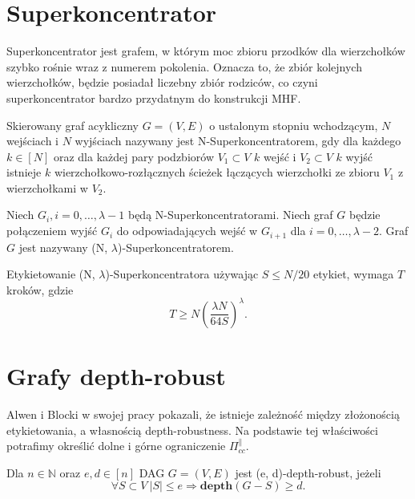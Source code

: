 \section{Superkoncentrator}
Superkoncentrator jest grafem, w którym moc zbioru przodków dla wierzchołków szybko rośnie wraz z numerem pokolenia. Oznacza to, że zbiór kolejnych wierzchołków, będzie posiadał liczebny zbiór rodziców, co czyni superkoncentrator bardzo przydatnym do konstrukcji MHF.
\begin{definition}[N-Superkoncentrator] Skierowany graf acykliczny $G = (V, E)$ o ustalonym stopniu wchodzącym, $N$ wejściach i
	$N$ wyjściach nazywany jest N-Superkoncentratorem, gdy dla każdego $k \in [N]$
	oraz dla każdej pary podzbiorów $V_{1} \subset V$ $k$ wejść i $V_{2} \subset V$ $k$ wyjść istnieje
	$k$ wierzchołkowo-rozłącznych ścieżek łączących wierzchołki ze zbioru $V_{1}$ z wierzchołkami w $V_{2}$.
\end{definition}

\begin{definition} Niech $G_{i}, i = 0, \dots, \lambda-1$ będą N-Superkoncentratorami.
	Niech graf $G$ będzie połączeniem wyjść $G_{i}$ do odpowiadających wejść w $G_{i+1}$ dla $i = 0, \dots, \lambda - 2$.
	Graf $G$ jest nazywany (N, $\lambda$)-Superkoncentratorem.
\end{definition}

\begin{lemma} \cite[Lemat 1]{rs}
	Etykietowanie (N, $\lambda$)-Superkoncentratora używając $S \leq N/20$ etykiet, wymaga $T$ kroków, gdzie
	$$ T \geq N \left( \frac{ \lambda N}{64 S} \right) ^{ \lambda }.$$
\end{lemma}

\section{Grafy depth-robust}

Alwen i Blocki w swojej pracy \cite{depth}
pokazali, że istnieje zależność między złożonością etykietowania, a własnością depth-robustness. Na podstawie tej właściwości potrafimy określić dolne i górne ograniczenie $\Pi_{ cc }^{ \parallel }$.

\begin{definition} Dla $n \in \mathbb{N}$ oraz $e, d \in [n]$ DAG $G = (V, E)$
	jest (e, d)-depth-robust, jeżeli
	$$ \forall S \subset V \ | S | \leq e \Rightarrow \mathbf{depth}(G - S) \geq d.$$
\end{definition}

